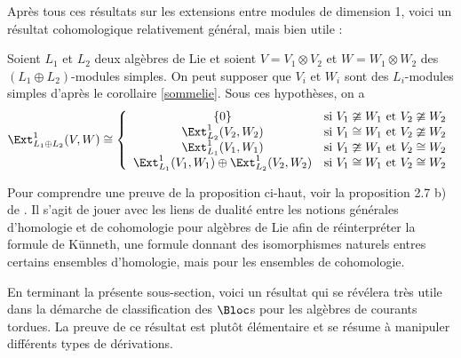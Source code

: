 Après tous ces résultats sur les extensions entre modules de dimension 1, voici un résultat cohomologique relativement général, mais bien utile :

\begin{Prop} \label{extsommelie} Soient $L_1$ et $L_2$ deux algèbres de Lie et soient $V = V_1 \otimes V_2$ et \linebreak $W = W_1 \otimes W_2$ des $(L_1 \oplus L_2)$-modules simples. On peut supposer que $V_i$ et $W_i$ sont des $L_i$-modules simples d'après le corollaire \ref{sommelie}. Sous ces hypothèses, on a 
\begin{equation}
\Ext_{L_1 \oplus L_2}^1(V, W) \cong \left\{
\begin{array}{cl} \{0\} & \text{si } V_1 \ncong W_1 \text{ et } V_2 \ncong W_2\\
\Ext_{L_2}^1(V_2,W_2) & \text{si } V_1 \cong W_1 \text{ et } V_2 \ncong W_2\\
\Ext_{L_1}^1(V_1,W_1) & \text{si } V_1 \ncong W_1 \text{ et } V_2 \cong W_2\\
\Ext_{L_1}^1(V_1,W_1) \oplus \Ext_{L_2}^1(V_2,W_2) & \text{si } V_1 \cong W_1 \text{ et } V_2 \cong W_2
\end{array} \right.
\end{equation}
\end{Prop}

Pour comprendre une preuve de la proposition ci-haut, voir la proposition 2.7 b) de \cite{NSext}. Il s'agit de jouer avec les liens de dualité entre les notions générales d'homologie et de cohomologie pour algèbres de Lie afin de réinterpréter la formule de Künneth, une formule donnant des isomorphismes naturels entres certains ensembles d'homologie, mais pour les ensembles de cohomologie.

En terminant la présente sous-section, voici un résultat qui se révélera très utile dans la démarche de classification des $\Bloc$s pour les algèbres de courants tordues. La preuve de ce résultat est plutôt élémentaire et se résume à manipuler différents types de dérivations.

